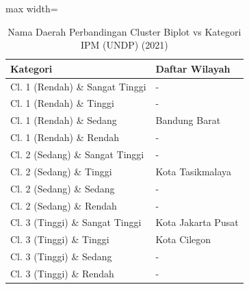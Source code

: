 \begin{table}[H]
\centering
\caption{Nama Daerah Perbandingan Cluster Biplot vs Kategori IPM (UNDP) (2021)} \label{tab:samplecrossname2021}
\begin{adjustbox}{max width=\textwidth}
\begin{tabular}{|p{4cm}|p{10cm}|}
\hline
\textbf{Kategori} & \textbf{Daftar Wilayah} \\
\hline
Cl. 1 (Rendah) \& Sangat Tinggi & - \\
\hline
Cl. 1 (Rendah) \& Tinggi & - \\
\hline
Cl. 1 (Rendah) \& Sedang & Bandung Barat \\
\hline
Cl. 1 (Rendah) \& Rendah & - \\
\hline
Cl. 2 (Sedang) \& Sangat Tinggi & - \\
\hline
Cl. 2 (Sedang) \& Tinggi & Kota Tasikmalaya \\
\hline
Cl. 2 (Sedang) \& Sedang & - \\
\hline
Cl. 2 (Sedang) \& Rendah & - \\
\hline
Cl. 3 (Tinggi) \& Sangat Tinggi & Kota Jakarta Pusat \\
\hline
Cl. 3 (Tinggi) \& Tinggi & Kota Cilegon \\
\hline
Cl. 3 (Tinggi) \& Sedang & - \\
\hline
Cl. 3 (Tinggi) \& Rendah & - \\
\hline
\end{tabular}
\end{adjustbox}
\end{table}